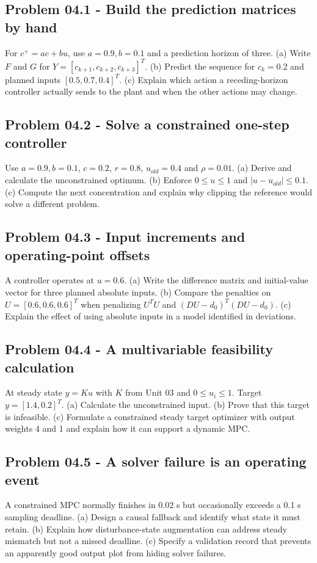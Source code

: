 \documentclass[11pt,a4paper]{article}
\begin{document}
\subsection{Problem 04.1 - Build the prediction matrices by hand}
For $c^+=ac+bu$, use $a=0.9,b=0.1$ and a prediction horizon of three. (a) Write $F$ and $G$ for $Y=[c_{k+1},c_{k+2},c_{k+3}]^T$. (b) Predict the sequence for $c_k=0.2$ and planned inputs $[0.5,0.7,0.4]^T$. (c) Explain which action a receding-horizon controller actually sends to the plant and when the other actions may change.

\subsection{Problem 04.2 - Solve a constrained one-step controller}
Use $a=0.9,b=0.1$, $c=0.2$, $r=0.8$, $u_{old}=0.4$ and $\rho=0.01$. (a) Derive and calculate the unconstrained optimum. (b) Enforce $0\leq u\leq1$ and $|u-u_{old}|\leq0.1$. (c) Compute the next concentration and explain why clipping the reference would solve a different problem.

\subsection{Problem 04.3 - Input increments and operating-point offsets}
A controller operates at $u=0.6$. (a) Write the difference matrix and initial-value vector for three planned absolute inputs. (b) Compare the penalties on $U=[0.6,0.6,0.6]^T$ when penalizing $U^TU$ and $(DU-d_0)^T(DU-d_0)$. (c) Explain the effect of using absolute inputs in a model identified in deviations.

\subsection{Problem 04.4 - A multivariable feasibility calculation}
At steady state $y=Ku$ with $K$ from Unit 03 and $0\leq u_i\leq1$. Target $y=[1.4,0.2]^T$. (a) Calculate the unconstrained input. (b) Prove that this target is infeasible. (c) Formulate a constrained steady target optimizer with output weights 4 and 1 and explain how it can support a dynamic MPC.

\subsection{Problem 04.5 - A solver failure is an operating event}
A constrained MPC normally finishes in 0.02 s but occasionally exceeds a 0.1 s sampling deadline. (a) Design a causal fallback and identify what state it must retain. (b) Explain how disturbance-state augmentation can address steady mismatch but not a missed deadline. (c) Specify a validation record that prevents an apparently good output plot from hiding solver failures.
\end{document}
